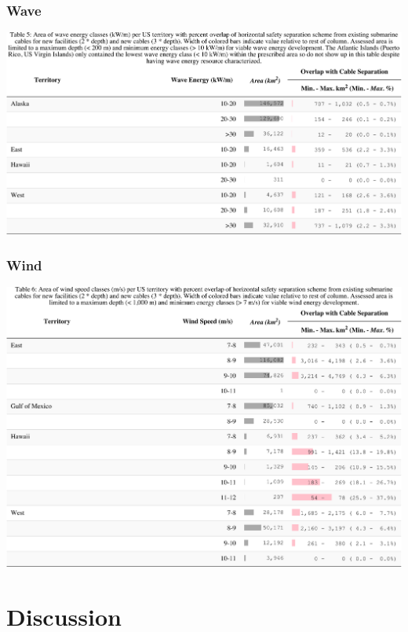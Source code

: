 \documentclass[]{article}
\begin{document}
\hypertarget{wave}{%
\subsubsection{Wave}\label{wave}}

\includegraphics{report_files/figure-latex/tbl05Wave-1.pdf}

\hypertarget{wind}{%
\subsubsection{Wind}\label{wind}}

\includegraphics{report_files/figure-latex/tbl06Wind-1.pdf}

\hypertarget{discussion}{%
\section{Discussion}\label{discussion}}
\end{document}
